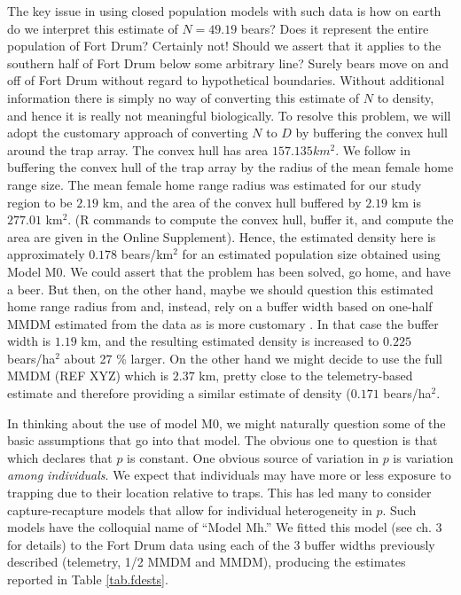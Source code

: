 The key issue in using closed population models with such data is how
on earth do we interpret this estimate of $N=49.19$ bears? Does it
represent the entire population of Fort Drum? Certainly not! Should we
assert that it applies to the southern half of Fort Drum below some
arbitrary line? Surely bears move on and off of Fort Drum without
regard to hypothetical boundaries. Without additional information
there is simply no way of converting this estimate of $N$ to density,
and hence it is really not meaningful biologically. To resolve this
problem, we will adopt the customary approach of converting $N$ to $D$
by buffering the convex hull around the trap array. The convex hull
has area $157.135 km^2$. We follow \citet{bales_etal:2005} in
buffering the convex hull of the trap array by the radius of the mean
female home range size. The mean female home range radius was
estimated \citep{wegan:2008} for our study region to be $2.19$ km, and
the area of the convex hull buffered by $2.19$ km is $277.01$ km$^2$. (R
commands to compute the convex hull, buffer it, and compute the area
are given in the Online Supplement).  Hence, the estimated density
here is approximately $0.178$ bears/km$^2$ for an estimated population
size obtained using Model M0.  We could assert that the problem has
been solved, go home, and have a beer.  But then, on the other hand,
maybe we should question this estimated home range radius from
\citep{wegan:2008} and, instead, rely on a buffer width based on
one-half MMDM estimated from the data as is more customary
\citep{dice:1938}. In that case the buffer width is $1.19$ km, and the
resulting estimated density is increased to $0.225$ bears/ha$^2$ about
27 \% larger.  On the other hand we might decide to use the full MMDM
(REF XYZ) which is $2.37$ km, pretty close to the telemetry-based estimate
and therefore providing a similar estimate of density ($0.171$ bears/ha$^2$.

In thinking about the use of model M0, we might naturally question
some of the basic assumptions that go into that model. The obvious one
to question is that which declares that $p$ is constant. One obvious
source of variation in $p$ is variation {\it among individuals}. We
expect that individuals may have more or less exposure to trapping due
to their location relative to traps. This has led many to consider
capture-recapture models that allow for individual heterogeneity in
$p$. Such models have the colloquial name of ``Model Mh.''
We fitted this model (see ch. 3 for details) to the Fort Drum data
using each of the 3 buffer widths previously described (telemetry, 1/2
MMDM and MMDM), producing the estimates reported in Table
\ref{tab.fdests}.

